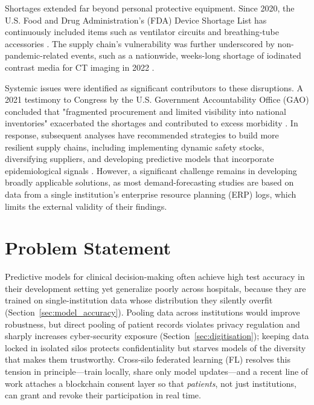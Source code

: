 \documentclass[12pt]{report}
\begin{document}
Shortages extended far beyond personal protective equipment. Since 2020, the U.S. Food and Drug Administration's (FDA) Device Shortage List has continuously included items such as ventilator circuits and breathing-tube accessories \cite{FDA506J2025}. The supply chain's vulnerability was further underscored by non-pandemic-related events, such as a nationwide, weeks-long shortage of iodinated contrast media for CT imaging in 2022 \cite{AHA2022ContrastShortage}.

Systemic issues were identified as significant contributors to these disruptions. A 2021 testimony to Congress by the U.S. Government Accountability Office (GAO) concluded that "fragmented procurement and limited visibility into national inventories" exacerbated the shortages and contributed to excess morbidity \cite{GAO2021COVIDSupply}. In response, subsequent analyses have recommended strategies to build more resilient supply chains, including implementing dynamic safety stocks, diversifying suppliers, and developing predictive models that incorporate epidemiological signals \cite{varnosfaderani_forouzanfar_2024}. However, a significant challenge remains in developing broadly applicable solutions, as most demand-forecasting studies are based on data from a single institution's enterprise resource planning (ERP) logs, which limits the external validity of their findings.


\section{Problem Statement}
Predictive models for clinical decision-making often achieve high test accuracy
in their development setting yet generalize poorly across hospitals, because they
are trained on single-institution data whose distribution they silently overfit
(Section~\ref{sec:model_accuracy}). Pooling data across institutions would improve
robustness, but direct pooling of patient records violates privacy regulation and
sharply increases cyber-security exposure (Section~\ref{sec:digitisation});
keeping data locked in isolated silos protects confidentiality but starves models
of the diversity that makes them trustworthy. Cross-silo federated learning (FL)
resolves this tension in principle---train locally, share only model
updates---and a recent line of work attaches a blockchain consent layer so that
\emph{patients}, not just institutions, can grant and revoke their participation
in real time.
\end{document}
